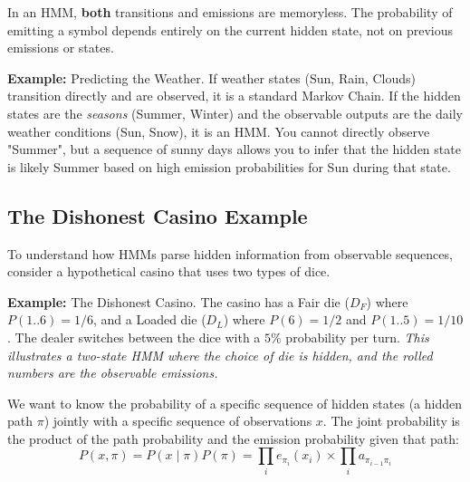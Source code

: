 \sta In an HMM, \textbf{both} transitions and emissions are memoryless. The probability of emitting a symbol depends entirely on the current hidden state, not on previous emissions or states.

\textbf{Example:} Predicting the Weather.
If weather states (Sun, Rain, Clouds) transition directly and are observed, it is a standard Markov Chain. If the hidden states are the \textit{seasons} (Summer, Winter) and the observable outputs are the daily weather conditions (Sun, Snow), it is an HMM. You cannot directly observe "Summer", but a sequence of sunny days allows you to infer that the hidden state is likely Summer based on high emission probabilities for Sun during that state.

\subsection{The Dishonest Casino Example}

To understand how HMMs parse hidden information from observable sequences, consider a hypothetical casino that uses two types of dice.

\begin{center}
\end{center}

\textbf{Example:} The Dishonest Casino.
The casino has a Fair die ($D_F$) where $P(1..6) = 1/6$, and a Loaded die ($D_L$) where $P(6) = 1/2$ and $P(1..5) = 1/10$. The dealer switches between the dice with a $5\%$ probability per turn.
\textit{This illustrates a two-state HMM where the choice of die is hidden, and the rolled numbers are the observable emissions.}

We want to know the probability of a specific sequence of hidden states (a hidden path $\pi$) jointly with a specific sequence of observations $x$. The joint probability is the product of the path probability and the emission probability given that path:
\[
  P(x, \pi) = P(x \mid \pi)P(\pi) = \prod_{i} e_{\pi_i}(x_i) \times \prod_{i} a_{\pi_{i-1}\pi_i}
\]

